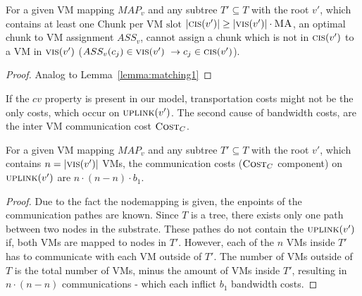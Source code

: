 \documentclass[9pt,twocolumn]{scrartcl}
\newcommand{\VmSlot}{\text{VM slot}}
\newcommand{\Chunk}{\ensuremath{c}}
\newcommand{\MaFactor}{\ensuremath{\textsc{MA}}}
\newcommand{\VmChunkAssignment}{\ensuremath{ASS_v}}
\newcommand{\NodeMapping}{\ensuremath{MAP_v}}
\newcommand{\SubstrateNode}{\ensuremath{v}}
\newcommand{\Cost}{\textsc{Cost}}
\newcommand{\Tree}{\ensuremath{T}}
\newcommand{\CostCom}{\ensuremath{b_1}}
\newcommand{\CostTrans}{\ensuremath{b_2}}
\newcommand{\Vms}{\ensuremath{n}}
\begin{document}
\begin{lemma}
\label{lemma:matching2}
For a given VM mapping $\NodeMapping$ and any subtree $\Tree' \subseteq
\Tree$ with the root $\SubstrateNode'$, which contains at least one Chunk per
$\VmSlot$ $|\ChunkCount(\SubstrateNode')| \geq |\VmCount(\SubstrateNode')|
\cdot \MaFactor$, an
optimal chunk to VM assignment $\VmChunkAssignment$, cannot assign a chunk
which is not in $\ChunkCount(\SubstrateNode')$ to a VM in
$\VmCount(\SubstrateNode')$ ($\VmChunkAssignment(\Chunk_j) \in
\VmCount(\SubstrateNode')~ \rightarrow \Chunk_j \in
\ChunkCount(\SubstrateNode')$).
\end{lemma}

\begin{proof}
 Analog to Lemma~\ref{lemma:matching1}
\end{proof}

If the $cv$ property is present in our model, transportation costs might not be
the only costs, which occur on $\Uplink(\SubstrateNode')$. The second cause of
bandwidth costs, are the inter VM communication cost $\Cost_C$.

\begin{corollary}
\label{corollary:comCost}
 For a given VM mapping $\NodeMapping$ and any subtree $\Tree' \subseteq
\Tree$ with the root $\SubstrateNode'$, which contains $n
= |\VmCount(\SubstrateNode')|$ VMs, the communication costs ($\Cost_C$
component) on
$\Uplink(\SubstrateNode')$ are $n \cdot (\Vms - n)
\cdot
\CostCom$.
\end{corollary}

\begin{proof}
Due to the fact the nodemapping is given, the enpoints of the communication
pathes are known. Since $\Tree$ is a tree, there exists only one path between
two nodes in the substrate. These pathes do not contain the
$\Uplink(\SubstrateNode')$ if, both VMs are mapped to nodes in $\Tree'$.
However, each of the $n$ VMs inside $\Tree'$ has to communicate with each VM
outside of $\Tree'$. The number of VMs outside of $\Tree$ is the total number
of VMs, minus the amount of VMs inside $\Tree'$, resulting in $n \cdot (\Vms -
n)$ communications - which each inflict $\CostCom$ bandwidth costs.
\end{proof}

%
\newcommand{\NodesToProcess}{\ensuremath{\textsc{nodesToProcess}}}
\end{document}

